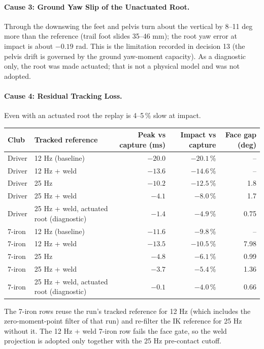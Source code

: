 \documentclass[11pt,a4paper]{article}
\begin{document}
\paragraph{Cause 3: Ground Yaw Slip of the Unactuated Root.} Through the
downswing the feet and pelvis turn about the vertical by 8--11 deg more than
the reference (trail foot slides 35--46 mm); the root yaw error at impact is
about $-0.19$ rad. This is the limitation recorded in decision 13 (the
pelvis drift is governed by the ground yaw-moment capacity). As a diagnostic
only, the root was made actuated; that is not a physical model and was not
adopted.

\paragraph{Cause 4: Residual Tracking Loss.} Even with an actuated root the
replay is 4--5\,\% slow at impact.

\begin{center}
\begin{tabular}{@{}llrrr@{}}
\toprule
Club & Tracked reference & Peak vs capture (ms) & Impact vs capture & Face gap (deg) \\
\midrule
Driver & 12 Hz (baseline) & $-20.0$ & $-20.1$\,\% & -- \\
Driver & 12 Hz + weld & $-13.6$ & $-14.6$\,\% & -- \\
Driver & 25 Hz & $-10.2$ & $-12.5$\,\% & 1.8 \\
Driver & 25 Hz + weld & $-4.1$ & $-8.0$\,\% & 1.7 \\
Driver & 25 Hz + weld, actuated root (diagnostic) & $-1.4$ & $-4.9$\,\% & 0.75 \\
7-iron & 12 Hz (baseline) & $-11.6$ & $-9.8$\,\% & -- \\
7-iron & 12 Hz + weld & $-13.5$ & $-10.5$\,\% & 7.98 \\
7-iron & 25 Hz & $-4.8$ & $-6.1$\,\% & 0.99 \\
7-iron & 25 Hz + weld & $-3.7$ & $-5.4$\,\% & 1.36 \\
7-iron & 25 Hz + weld, actuated root (diagnostic) & $-0.1$ & $-4.0$\,\% & 0.66 \\
\bottomrule
\end{tabular}
\end{center}
The 7-iron rows reuse the run's tracked reference for 12 Hz (which includes
the zero-moment-point filter of that run) and re-filter the IK reference for
25 Hz without it. The 12 Hz + weld 7-iron row fails the face gate, so the
weld projection is adopted only together with the 25 Hz pre-contact cutoff.
\end{document}
